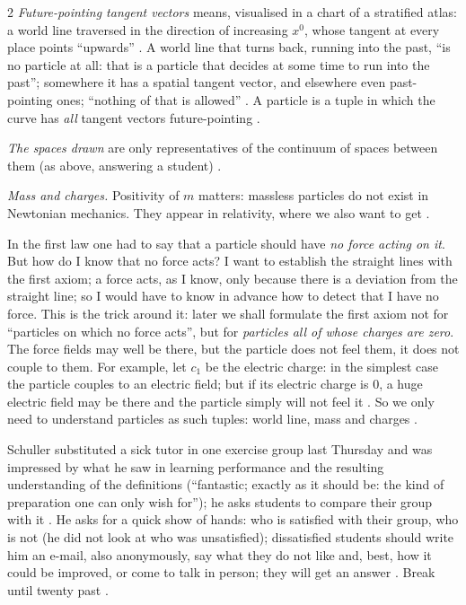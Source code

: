 \begin{paracol}{2}
\emph{Future-pointing tangent vectors} means, visualised in a chart of a stratified atlas: a world line traversed in the direction of increasing $x^0$, whose tangent at every place points ``upwards''
. A world line that turns back, running into the past, ``is no particle at all: that is a particle that decides at some time to run into the past''; somewhere it has a spatial tangent vector, and elsewhere even past-pointing ones;
``nothing of that is allowed'' . A particle is a tuple in which the curve has \emph{all} tangent vectors future-pointing .

\emph{The spaces drawn} are only representatives of the continuum of spaces between them (as above, answering a student) .

\emph{Mass and charges.} Positivity of $m$ matters: massless particles do not exist in Newtonian mechanics. They appear in relativity, where we also want to get .
\begin{intuition}\label{int:nk-charges}
In the first law one had to say that a particle should have \emph{no force acting on it}. But how do I know that no force acts? I want to establish the straight lines with the first axiom; a force acts, as I
know, only because there is a deviation from the straight line; so I would have to know in advance how to detect that I have no force. This is the trick around it: later we shall formulate the first axiom not for
``particles on which no force acts'', but for \emph{particles all of whose charges are zero}. The force fields may well be there, but the particle does not feel them, it does not couple to them. For example, let $c_1$ be the electric charge: in the simplest case the particle couples to an electric field; but if its electric charge is $0$, a huge electric field may be
there and the particle simply will not feel it . So we only need to understand particles as such tuples: world line, mass and charges .
\end{intuition}

\begin{aside}
Schuller substituted a sick tutor in one exercise group last Thursday and was impressed by what he saw in learning performance and the resulting understanding of the definitions
(``fantastic; exactly as it should be: the kind of preparation one can only wish for''); he asks students to compare their group with it .
He asks for a quick show of hands: who is satisfied with their group, who is not (he did not look at who was unsatisfied); dissatisfied students should write him an e-mail, also anonymously, say what they do not like
and, best, how it could be improved, or come to talk in person; they will get an answer . Break until twenty past .
\end{aside}


\end{paracol}
